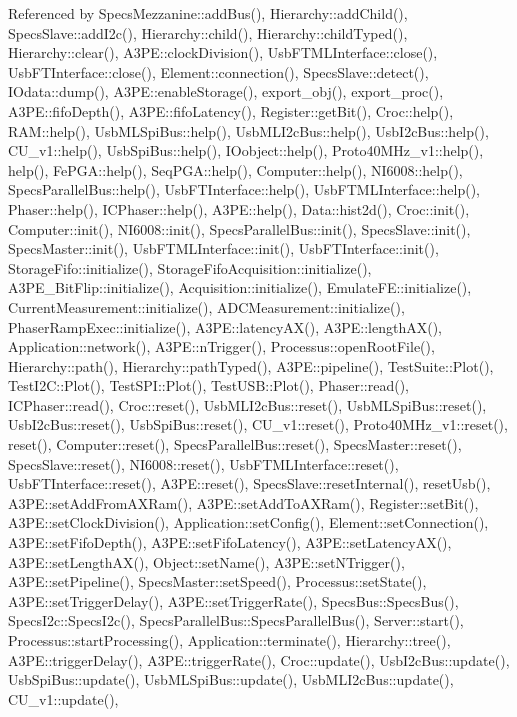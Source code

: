 Referenced by Specs\+Mezzanine\+::add\+Bus(), Hierarchy\+::add\+Child(), Specs\+Slave\+::add\+I2c(), Hierarchy\+::child(), Hierarchy\+::child\+Typed(), Hierarchy\+::clear(), A3\+P\+E\+::clock\+Division(), Usb\+F\+T\+M\+L\+Interface\+::close(), Usb\+F\+T\+Interface\+::close(), Element\+::connection(), Specs\+Slave\+::detect(), I\+Odata\+::dump(), A3\+P\+E\+::enable\+Storage(), export\+\_\+obj(), export\+\_\+proc(), A3\+P\+E\+::fifo\+Depth(), A3\+P\+E\+::fifo\+Latency(), Register\+::get\+Bit(), Croc\+::help(), R\+A\+M\+::help(), Usb\+M\+L\+Spi\+Bus\+::help(), Usb\+M\+L\+I2c\+Bus\+::help(), Usb\+I2c\+Bus\+::help(), C\+U\+\_\+v1\+::help(), Usb\+Spi\+Bus\+::help(), I\+Oobject\+::help(), Proto40\+M\+Hz\+\_\+v1\+::help(), help(), Fe\+P\+G\+A\+::help(), Seq\+P\+G\+A\+::help(), Computer\+::help(), N\+I6008\+::help(), Specs\+Parallel\+Bus\+::help(), Usb\+F\+T\+Interface\+::help(), Usb\+F\+T\+M\+L\+Interface\+::help(), Phaser\+::help(), I\+C\+Phaser\+::help(), A3\+P\+E\+::help(), Data\+::hist2d(), Croc\+::init(), Computer\+::init(), N\+I6008\+::init(), Specs\+Parallel\+Bus\+::init(), Specs\+Slave\+::init(), Specs\+Master\+::init(), Usb\+F\+T\+M\+L\+Interface\+::init(), Usb\+F\+T\+Interface\+::init(), Storage\+Fifo\+::initialize(), Storage\+Fifo\+Acquisition\+::initialize(), A3\+P\+E\+\_\+\+Bit\+Flip\+::initialize(), Acquisition\+::initialize(), Emulate\+F\+E\+::initialize(), Current\+Measurement\+::initialize(), A\+D\+C\+Measurement\+::initialize(), Phaser\+Ramp\+Exec\+::initialize(), A3\+P\+E\+::latency\+A\+X(), A3\+P\+E\+::length\+A\+X(), Application\+::network(), A3\+P\+E\+::n\+Trigger(), Processus\+::open\+Root\+File(), Hierarchy\+::path(), Hierarchy\+::path\+Typed(), A3\+P\+E\+::pipeline(), Test\+Suite\+::\+Plot(), Test\+I2\+C\+::\+Plot(), Test\+S\+P\+I\+::\+Plot(), Test\+U\+S\+B\+::\+Plot(), Phaser\+::read(), I\+C\+Phaser\+::read(), Croc\+::reset(), Usb\+M\+L\+I2c\+Bus\+::reset(), Usb\+M\+L\+Spi\+Bus\+::reset(), Usb\+I2c\+Bus\+::reset(), Usb\+Spi\+Bus\+::reset(), C\+U\+\_\+v1\+::reset(), Proto40\+M\+Hz\+\_\+v1\+::reset(), reset(), Computer\+::reset(), Specs\+Parallel\+Bus\+::reset(), Specs\+Master\+::reset(), Specs\+Slave\+::reset(), N\+I6008\+::reset(), Usb\+F\+T\+M\+L\+Interface\+::reset(), Usb\+F\+T\+Interface\+::reset(), A3\+P\+E\+::reset(), Specs\+Slave\+::reset\+Internal(), reset\+Usb(), A3\+P\+E\+::set\+Add\+From\+A\+X\+Ram(), A3\+P\+E\+::set\+Add\+To\+A\+X\+Ram(), Register\+::set\+Bit(), A3\+P\+E\+::set\+Clock\+Division(), Application\+::set\+Config(), Element\+::set\+Connection(), A3\+P\+E\+::set\+Fifo\+Depth(), A3\+P\+E\+::set\+Fifo\+Latency(), A3\+P\+E\+::set\+Latency\+A\+X(), A3\+P\+E\+::set\+Length\+A\+X(), Object\+::set\+Name(), A3\+P\+E\+::set\+N\+Trigger(), A3\+P\+E\+::set\+Pipeline(), Specs\+Master\+::set\+Speed(), Processus\+::set\+State(), A3\+P\+E\+::set\+Trigger\+Delay(), A3\+P\+E\+::set\+Trigger\+Rate(), Specs\+Bus\+::\+Specs\+Bus(), Specs\+I2c\+::\+Specs\+I2c(), Specs\+Parallel\+Bus\+::\+Specs\+Parallel\+Bus(), Server\+::start(), Processus\+::start\+Processing(), Application\+::terminate(), Hierarchy\+::tree(), A3\+P\+E\+::trigger\+Delay(), A3\+P\+E\+::trigger\+Rate(), Croc\+::update(), Usb\+I2c\+Bus\+::update(), Usb\+Spi\+Bus\+::update(), Usb\+M\+L\+Spi\+Bus\+::update(), Usb\+M\+L\+I2c\+Bus\+::update(), C\+U\+\_\+v1\+::update(), 